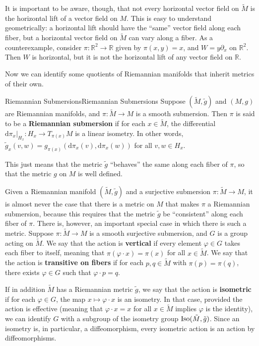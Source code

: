 \documentclass[../main.tex]{subfiles}
\begin{document}
\begin{remark}
	It is important to be aware, though, that not every horizontal vector field on $\tilde{M}$ is the horizontal lift of a vector field on $M$. This is easy to understand geometrically: a horizontal lift should have the ``same'' vector field along each fiber, but a horizontal vector field on $\tilde{M}$ can vary along a fiber. As a counterexample, consider $\pi: \mathbb{R}^2 \to \mathbb{R}$ given by $\pi(x, y) = x$, and $W = y \partial_x$ on $\mathbb{R}^2$. Then $W$ is horizontal, but it is not the horizontal lift of any vector field on $\mathbb{R}$.
\end{remark}

Now we can identify some quotients of Riemannian manifolds that inherit metrics of their own.

\begin{definition}{Riemannian Submersions}{Riemannian Submersions}
	Suppose $(\tilde{M}, \tilde{g})$ and $(M, g)$ are Riemannian manifolds, and $\pi: \tilde{M} \to M$ is a smooth submersion. Then $\pi$ is said to be a \textbf{Riemannian submersion} if for each $x \in \tilde{M}$, the differential $\mathrm{d}\pi_x|_{H_x}: H_x \to T_{\pi(x)}M$ is a linear isometry. In other words, $\tilde{g}_x(v, w) = g_{\pi(x)}(\mathrm{d}\pi_x(v), \mathrm{d}\pi_x(w))$ for all $v, w \in H_x$.
\end{definition}
This just means that the metric $\tilde{g}$ ``behaves'' the same along each fiber of $\pi$, so that the metric $g$ on $M$ is well defined.

Given a Riemannian manifold $(\tilde{M}, \tilde{g})$ and a surjective submersion $\pi: \tilde{M} \to M$, it is almost never the case that there is a metric on $M$ that makes $\pi$ a Riemannian submersion, because this requires that the metric $\tilde{g}$ be ``consistent'' along each fiber of $\pi$. There is, however, an important special case in which there is such a metric. Suppose $\pi: \tilde{M} \to M$ is a smooth surjective submersion, and $G$ is a group acting on $\tilde{M}$. We say that the action is \textbf{vertical} if every element $\varphi \in G$ takes each fiber to itself, meaning that $\pi(\varphi \cdot x) = \pi(x)$ for all $x \in \tilde{M}$. We say that the action is \textbf{transitive on fibers} if for each $p, q \in \tilde{M}$ with $\pi(p) = \pi(q)$, there exists $\varphi \in G$ such that $\varphi \cdot p = q$.

If in addition $\tilde{M}$ has a Riemannian metric $\tilde{g}$, we say that the action is \textbf{isometric} if for each $\varphi \in G$, the map $x \mapsto \varphi \cdot x$ is an isometry. In that case, provided the action is effective (meaning that $\varphi \cdot x = x$ for all $x \in \tilde{M}$ implies $\varphi$ is the identity), we can identify $G$ with a subgroup of the isometry group $\operatorname{Iso}(\tilde{M}, \tilde{g})$. Since an isometry is, in particular, a diffeomorphism, every isometric action is an action by diffeomorphisms.
\end{document}
